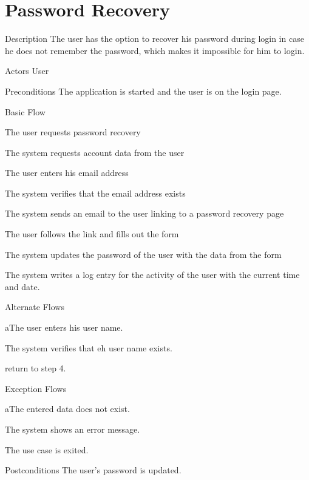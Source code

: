 \section{Password Recovery}

%
\begin{cpart}{Description}
The user has the option to recover his password during login in case he does not remember the password, which makes it impossible for him to login.
\end{cpart}


%
\begin{cpart}{Actors}
User
\end{cpart}

%
\begin{cpart}{Preconditions}
The application is started and the user is on the login page.
\end{cpart}

%
\begin{cpartList}{Basic Flow}
  \item The user requests password recovery
  \item The system requests account data from the user
  \item The user enters his email address
  \item The system verifies that the email address exists
  \item The system sends an email to the user linking to a password recovery page
  \item The user follows the link and fills out the form
  \item The system updates the password of the user with the data from the form
  \item The system writes a log entry for the activity of the user with the current time and date.
\end{cpartList}

%
\begin{cpartList}{Alternate Flows}
  \begin{innerList}{3}{a}{The user enters his user name.}
    \item The system verifies that eh user name exists.
    \item return to step 4.
  \end{innerList}
\end{cpartList}

%
\begin{cpartList}{Exception Flows}
  \begin{innerList}{4}{a}{The entered data does not exist.}
    \item The system shows an error message.
    \item The use case is exited.
  \end{innerList}
\end{cpartList}

%
\begin{cpart}{Postconditions}
The user's password is updated.
\end{cpart}

